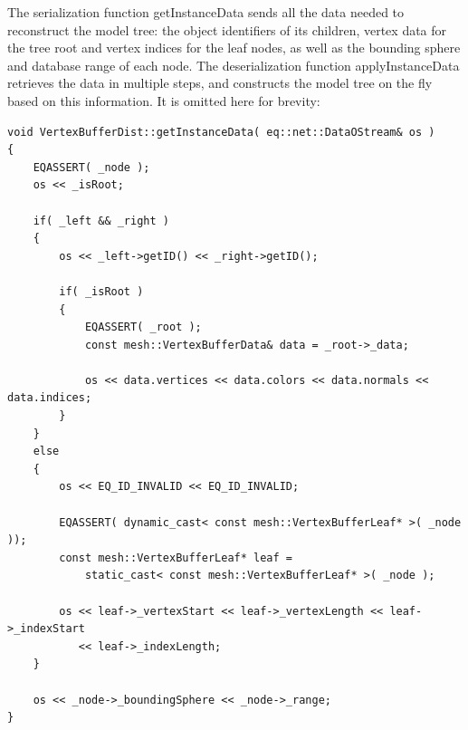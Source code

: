 \documentclass[10pt,a4]{scrartcl}
\begin{document}
The serialization function \textsf{getInstanceData} sends all the data
needed to reconstruct the model tree: the object identifiers of its
children, vertex data for the tree root and vertex indices for the leaf
nodes, as well as the bounding sphere and database range of each
node. The deserialization function \textsf{applyInstanceData} retrieves
the data in multiple steps, and constructs the model tree on the fly
based on this information. It is omitted here for brevity:


{\footnotesize\begin{lstlisting}
void VertexBufferDist::getInstanceData( eq::net::DataOStream& os )
{
    EQASSERT( _node );
    os << _isRoot;

    if( _left && _right )
    {
        os << _left->getID() << _right->getID();

        if( _isRoot )
        {
            EQASSERT( _root );
            const mesh::VertexBufferData& data = _root->_data;
            
            os << data.vertices << data.colors << data.normals << data.indices;
        }
    }
    else
    {
        os << EQ_ID_INVALID << EQ_ID_INVALID;

        EQASSERT( dynamic_cast< const mesh::VertexBufferLeaf* >( _node ));
        const mesh::VertexBufferLeaf* leaf = 
            static_cast< const mesh::VertexBufferLeaf* >( _node );

        os << leaf->_vertexStart << leaf->_vertexLength << leaf->_indexStart
           << leaf->_indexLength;
    }

    os << _node->_boundingSphere << _node->_range;
}
\end{lstlisting}}%
\end{document}

